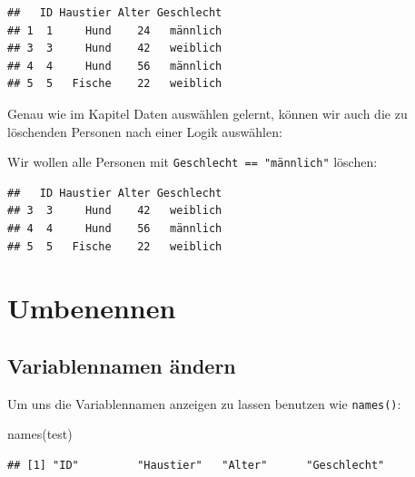 \documentclass[
]{book}
\newenvironment{Shaded}{\begin{snugshade}}{\end{snugshade}}
\newcommand{\CommentTok}[1]{\textcolor[rgb]{0.56,0.35,0.01}{\textit{#1}}}
\newcommand{\FunctionTok}[1]{\textcolor[rgb]{0.00,0.00,0.00}{#1}}
\newcommand{\NormalTok}[1]{#1}
\newcommand{\OtherTok}[1]{\textcolor[rgb]{0.56,0.35,0.01}{#1}}
\newcommand{\SpecialCharTok}[1]{\textcolor[rgb]{0.00,0.00,0.00}{#1}}
\newcommand{\StringTok}[1]{\textcolor[rgb]{0.31,0.60,0.02}{#1}}
\begin{document}
\begin{verbatim}
##   ID Haustier Alter Geschlecht
## 1  1     Hund    24   männlich
## 3  3     Hund    42   weiblich
## 4  4     Hund    56   männlich
## 5  5   Fische    22   weiblich
\end{verbatim}

Genau wie im Kapitel Daten auswählen gelernt, können wir auch die zu löschenden Personen nach einer Logik auswählen:

Wir wollen alle Personen mit \texttt{Geschlecht\ ==\ "männlich"} löschen:

\begin{Shaded}
\end{Shaded}

\begin{verbatim}
##   ID Haustier Alter Geschlecht
## 3  3     Hund    42   weiblich
## 4  4     Hund    56   männlich
## 5  5   Fische    22   weiblich
\end{verbatim}

\hypertarget{umbenennen}{%
\section{Umbenennen}\label{umbenennen}}

\hypertarget{variablennamen-uxe4ndern}{%
\subsection{Variablennamen ändern}\label{variablennamen-uxe4ndern}}

Um uns die Variablennamen anzeigen zu lassen benutzen wie \texttt{names()}:

\begin{Shaded}
\begin{Highlighting}[]
\FunctionTok{names}\NormalTok{(test)}
\end{Highlighting}
\end{Shaded}

\begin{verbatim}
## [1] "ID"         "Haustier"   "Alter"      "Geschlecht"
\end{verbatim}
\end{document}
